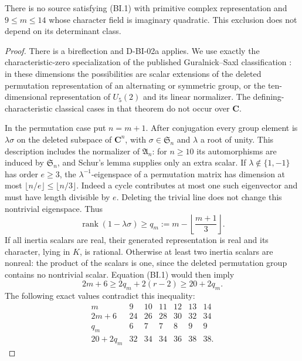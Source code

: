 \begin{theorem}
\label{D-BI-02}
There is no source satisfying (BI.1) with primitive complex
representation and $9\le m\le14$ whose character field is imaginary
quadratic.  This exclusion does not depend on its determinant class.
\end{theorem}
\begin{proof}
There is a bireflection and D-BI-02a applies.  We use exactly the
characteristic-zero specialization of the published
Guralnick--Saxl classification \cite[Theorem~7.1 and Remark~(3),
pp.~548--549]{BI:GS}: in these dimensions the possibilities are
scalar extensions of the deleted permutation representation of an
alternating or symmetric group, or the ten-dimensional representation
of $U_5(2)$ and its linear normalizer.  The defining-characteristic
classical cases in that theorem do not occur over $\mathbf C$.

In the permutation case put $n=m+1$.  After conjugation every group
element is $\lambda\sigma$ on the deleted subspace of
$\mathbf C^n$, with $\sigma\in\mathfrak S_n$ and $\lambda$ a root
of unity.  This description includes the normalizer of
$\mathfrak A_n$: for $n\ge10$ its automorphisms are induced by
$\mathfrak S_n$, and Schur's lemma supplies only an extra scalar.
If $\lambda\notin\{1,-1\}$ has order $e\ge3$, the
$\lambda^{-1}$-eigenspace of a permutation matrix has dimension
at most $\lfloor n/e\rfloor\le\lfloor n/3\rfloor$.
Indeed a cycle contributes at most one such eigenvector and must
have length divisible by $e$.  Deleting the trivial line does not
change this nontrivial eigenspace.  Thus
\[
 \operatorname{rank}(1-\lambda\sigma)
       \ge q_m:=m-\left\lfloor\frac{m+1}{3}\right\rfloor.
\tag{BI.5}
\]
If all inertia scalars are real, their generated representation is
real and its character, lying in $K$, is rational.  Otherwise at
least two inertia scalars are nonreal: the product of the scalars
is one, since the deleted permutation group contains no nontrivial
scalar.  Equation (BI.1) would then imply
\[
        2m+6\ge2q_m+2(r-2)\ge20+2q_m.
\tag{BI.6}
\]
The following exact values contradict this inequality:
\[
\begin{array}{c|rrrrrr}
m&9&10&11&12&13&14\\ \hline
2m+6&24&26&28&30&32&34\\
q_m&6&7&7&8&9&9\\
20+2q_m&32&34&34&36&38&38.
\end{array}
\]


\end{proof}
